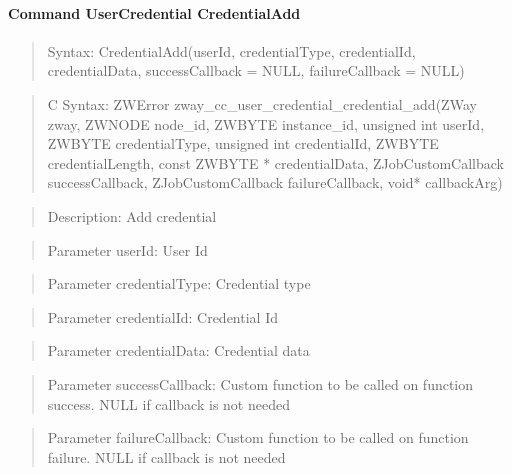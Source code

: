 \paragraph{Command UserCredential CredentialAdd}
\begin{quote}Syntax: CredentialAdd(userId, credentialType, credentialId, credentialData, successCallback = NULL, failureCallback = NULL)\end{quote}
\begin{quote}C Syntax: ZWError zway\_cc\_user\_credential\_credential\_add(ZWay zway, ZWNODE node\_id, ZWBYTE instance\_id, unsigned int userId, ZWBYTE credentialType, unsigned int credentialId, ZWBYTE credentialLength, const ZWBYTE * credentialData, ZJobCustomCallback successCallback, ZJobCustomCallback failureCallback, void* callbackArg)\end{quote}
\begin{quote}Description: Add credential\end{quote}
\begin{quote}Parameter userId: User Id\end{quote}
\begin{quote}Parameter credentialType: Credential type\end{quote}
\begin{quote}Parameter credentialId: Credential Id\end{quote}
\begin{quote}Parameter credentialData: Credential data\end{quote}
\begin{quote}Parameter successCallback: Custom function to be called on function success. NULL if callback is not needed\end{quote}
\begin{quote}Parameter failureCallback: Custom function to be called on function failure. NULL if callback is not needed\end{quote}


